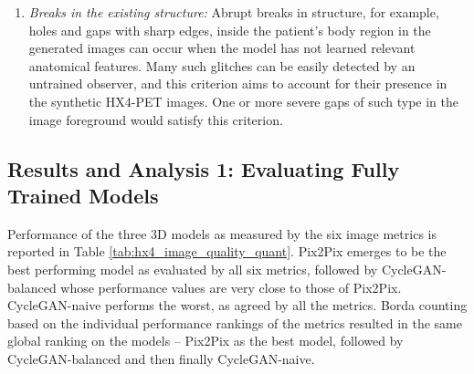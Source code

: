 \begin{enumerate}
    \item \textit{Breaks in the existing structure:} Abrupt breaks in structure, for example, holes and gaps with sharp edges, inside the patient's body region in the generated images can occur when the model has not learned relevant anatomical features. Many such glitches can be easily detected by an untrained observer, and this criterion aims to account for their presence in the synthetic HX4-PET images. One or more severe gaps of such type in the image foreground would satisfy this criterion.
\end{enumerate}



\subsection{Results and Analysis 1: Evaluating Fully Trained Models}
Performance of the three 3D models as measured by the six image metrics is reported in Table \ref{tab:hx4_image_quality_quant}. Pix2Pix emerges to be the best performing model as evaluated by all six metrics, followed by CycleGAN-balanced whose performance values are very close to those of Pix2Pix. CycleGAN-naive performs the worst, as agreed by all the metrics. Borda counting based on the individual performance rankings of the metrics resulted in the same global ranking on the models -- Pix2Pix as the best model, followed by CycleGAN-balanced and then finally CycleGAN-naive.


